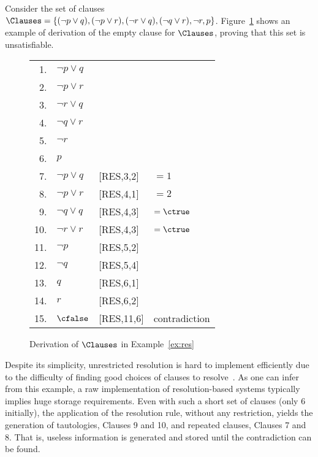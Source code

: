 \begin{example}%
\label{ex:res}
    Consider the set of clauses $\Clauses = \{(\neg p \lor q), (\neg p \lor r),
    (\neg r \lor q), (\neg q \lor r), \neg r, p\}$. Figure~\ref{tab:res} shows an
    example of derivation of the empty clause for $\Clauses$, proving that this
    set is unsatisfiable. 

    \begin{figure}%
        \centering
        \begin{tabular}{rlll}
            1. & $\neg p \lor q$ & & \\
            2. & $\neg p \lor r$ & & \\
            3. & $\neg r \lor q$ & & \\
            4. & $\neg q \lor r$ & & \\
            5. & $\neg r$ & & \\
            6. & $p$ & & \\
            7. & $\neg p \lor q$ & [RES,3,2] & $= 1$\\
            8. & $\neg p \lor r$ & [RES,4,1] & $= 2$\\
            9. & $\neg q \lor q$ & [RES,4,3] & $= \ctrue$\\
            10.&  $\neg r \lor r$ & [RES,4,3] & $= \ctrue$\\
            11.&  $\neg p$ & [RES,5,2] & \\
            12.&  $\neg q$ & [RES,5,4] & \\
            13.&  $q$ & [RES,6,1] & \\
            14.&  $r$ & [RES,6,2] & \\
            15.&  $\cfalse$ & [RES,11,6] & contradiction\\
        \end{tabular}%
    \caption{Derivation of $\Clauses$ in Example~\ref{ex:res}}%
    \label{tab:res}
    \end{figure}

    Despite its simplicity, unrestricted resolution is hard to implement
    efficiently due to the difficulty of finding good choices of clauses to
    resolve~\cite{satchapter}. As one can infer from this example, a raw
    implementation of resolution-based systems typically implies huge storage
    requirements. Even with such a short set of clauses (only 6 initially), the
    application of the resolution rule, without any restriction, yields the
    generation of tautologies, Clauses 9 and 10, and repeated clauses, Clauses 7
    and 8. That is, useless information is generated and stored until the
    contradiction can be found. 
\end{example}

